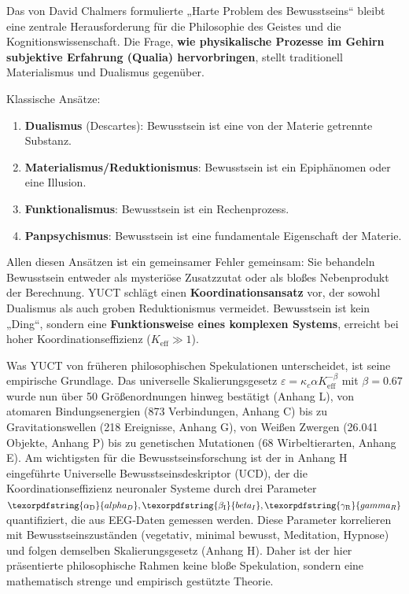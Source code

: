 \documentclass[12pt,a4paper]{article}
\DeclareRobustCommand{\alD}{\texorpdfstring{\ensuremath{\alpha_{\mathrm{D}}}}{alpha_D}}
\DeclareRobustCommand{\beI}{\texorpdfstring{\ensuremath{\beta_{\mathrm{I}}}}{beta_I}}
\DeclareRobustCommand{\gaR}{\texorpdfstring{\ensuremath{\gamma_{\mathrm{R}}}}{gamma_R}}
\newcommand{\eff}{\mathrm{eff}}
\newcommand{\Ke}{K_{\eff}}
\begin{document}
	Das von David Chalmers formulierte „Harte Problem des Bewusstseins“ bleibt eine zentrale Herausforderung für die Philosophie des Geistes und die Kognitionswissenschaft. Die Frage, \textbf{wie physikalische Prozesse im Gehirn subjektive Erfahrung (Qualia) hervorbringen}, stellt traditionell Materialismus und Dualismus gegenüber.
	
	Klassische Ansätze:
	\begin{enumerate}
		\item \textbf{Dualismus} (Descartes): Bewusstsein ist eine von der Materie getrennte Substanz.
		\item \textbf{Materialismus/Reduktionismus}: Bewusstsein ist ein Epiphänomen oder eine Illusion.
		\item \textbf{Funktionalismus}: Bewusstsein ist ein Rechenprozess.
		\item \textbf{Panpsychismus}: Bewusstsein ist eine fundamentale Eigenschaft der Materie.
	\end{enumerate}
	
	Allen diesen Ansätzen ist ein gemeinsamer Fehler gemeinsam: Sie behandeln Bewusstsein entweder als mysteriöse Zusatzzutat oder als bloßes Nebenprodukt der Berechnung. YUCT schlägt einen \textbf{Koordinationsansatz} vor, der sowohl Dualismus als auch groben Reduktionismus vermeidet. Bewusstsein ist kein „Ding“, sondern eine \textbf{Funktionsweise eines komplexen Systems}, erreicht bei hoher Koordinationseffizienz ($\Ke \gg 1$).
	
	Was YUCT von früheren philosophischen Spekulationen unterscheidet, ist seine empirische Grundlage. Das universelle Skalierungsgesetz \(\varepsilon = \kappa_c \alpha \Ke^{-\beta}\) mit \(\beta = 0.67\) wurde nun über 50 Größenordnungen hinweg bestätigt (Anhang L), von atomaren Bindungsenergien (873 Verbindungen, Anhang C) bis zu Gravitationswellen (218 Ereignisse, Anhang G), von Weißen Zwergen (26.041 Objekte, Anhang P) bis zu genetischen Mutationen (68 Wirbeltierarten, Anhang E). Am wichtigsten für die Bewusstseinsforschung ist der in Anhang H eingeführte Universelle Bewusstseinsdeskriptor (UCD), der die Koordinationseffizienz neuronaler Systeme durch drei Parameter \(\alD, \beI, \gaR\) quantifiziert, die aus EEG‑Daten gemessen werden. Diese Parameter korrelieren mit Bewusstseinszuständen (vegetativ, minimal bewusst, Meditation, Hypnose) und folgen demselben Skalierungsgesetz (Anhang H). Daher ist der hier präsentierte philosophische Rahmen keine bloße Spekulation, sondern eine mathematisch strenge und empirisch gestützte Theorie.
	
\end{document}
